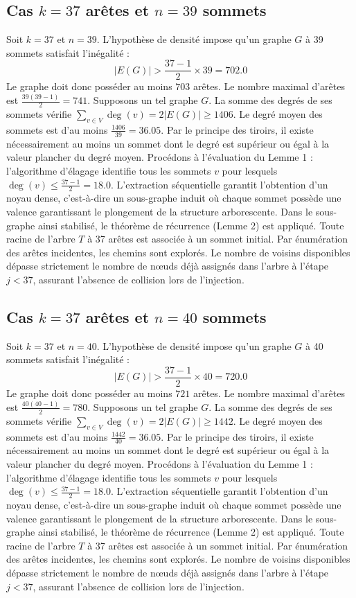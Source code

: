 \documentclass[12pt,a4paper]{article}
\begin{document}
\subsection{Cas $k = 37$ arêtes et $n = 39$ sommets}
Soit $k = 37$ et $n = 39$. L'hypothèse de densité impose qu'un graphe $G$ à 39 sommets satisfait l'inégalité :
$$ |E(G)| > \frac{37-1}{2} \times 39 = 702.0 $$
Le graphe doit donc posséder au moins $703$ arêtes. Le nombre maximal d'arêtes est $\frac{39(39-1)}{2} = 741$.
Supposons un tel graphe $G$. La somme des degrés de ses sommets vérifie $\sum_{v \in V} \deg(v) = 2|E(G)| \geq 1406$.
Le degré moyen des sommets est d'au moins $\frac{1406}{39} = 36.05$.
Par le principe des tiroirs, il existe nécessairement au moins un sommet dont le degré est supérieur ou égal à la valeur plancher du degré moyen.
Procédons à l'évaluation du Lemme 1 : l'algorithme d'élagage identifie tous les sommets $v$ pour lesquels $\deg(v) \leq \frac{37-1}{2} = 18.0$.
L'extraction séquentielle garantit l'obtention d'un noyau dense, c'est-à-dire un sous-graphe induit où chaque sommet possède une valence garantissant le plongement de la structure arborescente.
Dans le sous-graphe ainsi stabilisé, le théorème de récurrence (Lemme 2) est appliqué. Toute racine de l'arbre $T$ à 37 arêtes est associée à un sommet initial. Par énumération des arêtes incidentes, les chemins sont explorés. Le nombre de voisins disponibles dépasse strictement le nombre de nœuds déjà assignés dans l'arbre à l'étape $j < 37$, assurant l'absence de collision lors de l'injection.

\subsection{Cas $k = 37$ arêtes et $n = 40$ sommets}
Soit $k = 37$ et $n = 40$. L'hypothèse de densité impose qu'un graphe $G$ à 40 sommets satisfait l'inégalité :
$$ |E(G)| > \frac{37-1}{2} \times 40 = 720.0 $$
Le graphe doit donc posséder au moins $721$ arêtes. Le nombre maximal d'arêtes est $\frac{40(40-1)}{2} = 780$.
Supposons un tel graphe $G$. La somme des degrés de ses sommets vérifie $\sum_{v \in V} \deg(v) = 2|E(G)| \geq 1442$.
Le degré moyen des sommets est d'au moins $\frac{1442}{40} = 36.05$.
Par le principe des tiroirs, il existe nécessairement au moins un sommet dont le degré est supérieur ou égal à la valeur plancher du degré moyen.
Procédons à l'évaluation du Lemme 1 : l'algorithme d'élagage identifie tous les sommets $v$ pour lesquels $\deg(v) \leq \frac{37-1}{2} = 18.0$.
L'extraction séquentielle garantit l'obtention d'un noyau dense, c'est-à-dire un sous-graphe induit où chaque sommet possède une valence garantissant le plongement de la structure arborescente.
Dans le sous-graphe ainsi stabilisé, le théorème de récurrence (Lemme 2) est appliqué. Toute racine de l'arbre $T$ à 37 arêtes est associée à un sommet initial. Par énumération des arêtes incidentes, les chemins sont explorés. Le nombre de voisins disponibles dépasse strictement le nombre de nœuds déjà assignés dans l'arbre à l'étape $j < 37$, assurant l'absence de collision lors de l'injection.
\end{document}

